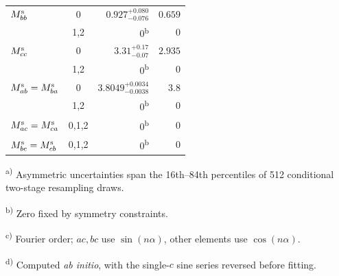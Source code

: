 \begin{table}
\begin{tabular}{@{}lcrr@{}}
$M^{\rm s}_{bb}$ & 0 & ${0.927}_{-0.076}^{+0.080}$ & $0.659$\\
 & 1,2 & $0$\textsuperscript{b} & $0$\\
$M^{\rm s}_{cc}$ & 0 & ${3.31}_{-0.07}^{+0.17}$ & $2.935$\\
 & 1,2 & $0$\textsuperscript{b} & $0$\\
$M^{\rm s}_{ab}=M^{\rm s}_{ba}$ & 0 & ${3.8049}_{-0.0038}^{+0.0034}$ & $3.8$\\
 & 1,2 & $0$\textsuperscript{b} & $0$\\
$M^{\rm s}_{ac}=M^{\rm s}_{ca}$ & 0,1,2 & $0$\textsuperscript{b} & $0$\\
$M^{\rm s}_{bc}=M^{\rm s}_{cb}$ & 0,1,2 & $0$\textsuperscript{b} & $0$\\
\bottomrule
\end{tabular}
\endgroup

\par\vspace{3pt}
\begin{minipage}{\linewidth}
\footnotesize\raggedright
\textsuperscript{a)} Asymmetric uncertainties span the 16th--84th percentiles of 512 conditional two-stage resampling draws.\par
\textsuperscript{b)} Zero fixed by symmetry constraints.\par
\textsuperscript{c)} Fourier order; $ac,bc$ use $\sin(n\alpha)$, other elements use $\cos(n\alpha)$.\par
\textsuperscript{d)} Computed \textit{ab initio}, with the single-$c$ sine series reversed before fitting.\par
\end{minipage}
\par\endgroup
\end{table}
